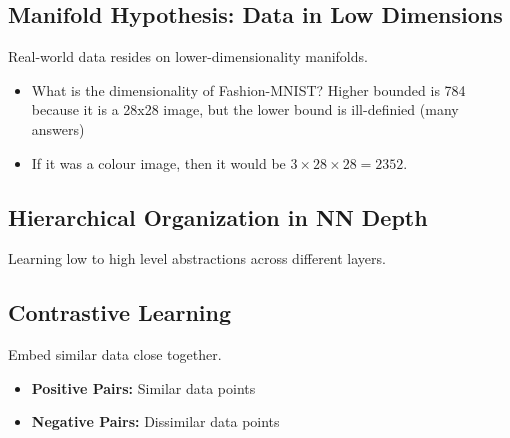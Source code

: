 \subsection{Manifold Hypothesis: Data in Low Dimensions}
\begin{notes}
    Real-world data resides on lower-dimensionality manifolds.
    \begin{itemize}
        \item What is the dimensionality of Fashion-MNIST? Higher bounded is 784 because it is a 28x28 image, but the lower bound is ill-definied (many answers)
        \item If it was a colour image, then it would be $3 \times 28 \times 28 = 2352$.
    \end{itemize}
\end{notes}

\subsection{Hierarchical Organization in NN Depth}
\begin{notes}
    Learning low to high level abstractions across different layers.
\end{notes}

\subsection{Contrastive Learning}
\begin{notes}
    Embed similar data close together. 
    \begin{itemize}
        \item \textbf{Positive Pairs:} Similar data points
        \item \textbf{Negative Pairs:} Dissimilar data points
    \end{itemize}
\end{notes}